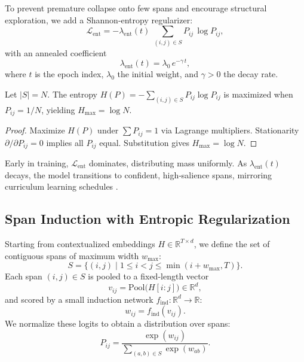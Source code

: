 To prevent premature collapse onto few spans and encourage structural exploration, we add a Shannon‐entropy regularizer:
\[
\mathcal{L}_{\mathrm{ent}}
= -\lambda_{\mathrm{ent}}(t)\;\sum_{(i,j)\in S}
P_{ij}\,\log P_{ij},
\]
with an annealed coefficient
\[
\lambda_{\mathrm{ent}}(t)
= \lambda_0\,e^{-\gamma\,t},
\]
where \(t\) is the epoch index, \(\lambda_0\) the initial weight, and \(\gamma>0\) the decay rate.

\begin{proposition}
	Let \(|S|=N\).  The entropy
	\(\displaystyle H(P)=-\sum_{(i,j)\in S}P_{ij}\log P_{ij}\)
	is maximized when \(P_{ij}=1/N\), yielding \(H_{\max}=\log N\).
\end{proposition}

\begin{proof}
	Maximize \(H(P)\) under \(\sum P_{ij}=1\) via Lagrange multipliers.  Stationarity \(\partial/\partial P_{ij}=0\) implies all \(P_{ij}\) equal.  Substitution gives \(H_{\max}=\log N\).
\end{proof}

Early in training, \(\mathcal{L}_{\mathrm{ent}}\) dominates, distributing mass uniformly.  As \(\lambda_{\mathrm{ent}}(t)\) decays, the model transitions to confident, high‐salience spans, mirroring curriculum learning schedules \cite{raffel2020t5,kreutzer2021distilling}.  

\subsection{Span Induction with Entropic Regularization}
\label{sec:span-induction}

Starting from contextualized embeddings \(H\in\mathbb{R}^{T\times d}\), we define the set of contiguous spans of maximum width \(w_{\max}\):
\begin{equation}
	S = \bigl\{(i,j)\;\big|\;1\le i<j\le \min(i+w_{\max},T)\bigr\}.
	\label{eq:contiguous_span_set}
\end{equation}
Each span \((i,j)\in S\) is pooled to a fixed-length vector
\[
v_{ij} = \mathrm{Pool}\bigl(H[i:j]\bigr)\in\mathbb{R}^d,
\]
and scored by a small induction network \(f_{\mathrm{ind}}:\mathbb{R}^d\to\mathbb{R}\):
\[
w_{ij} = f_{\mathrm{ind}}(v_{ij}).
\]
We normalize these logits to obtain a distribution over spans:
\begin{equation}
	P_{ij}
	= \frac{\exp(w_{ij})}
	{\sum_{(a,b)\in S}\exp(w_{ab})}.
	\label{eq:span_softmax}
\end{equation}


